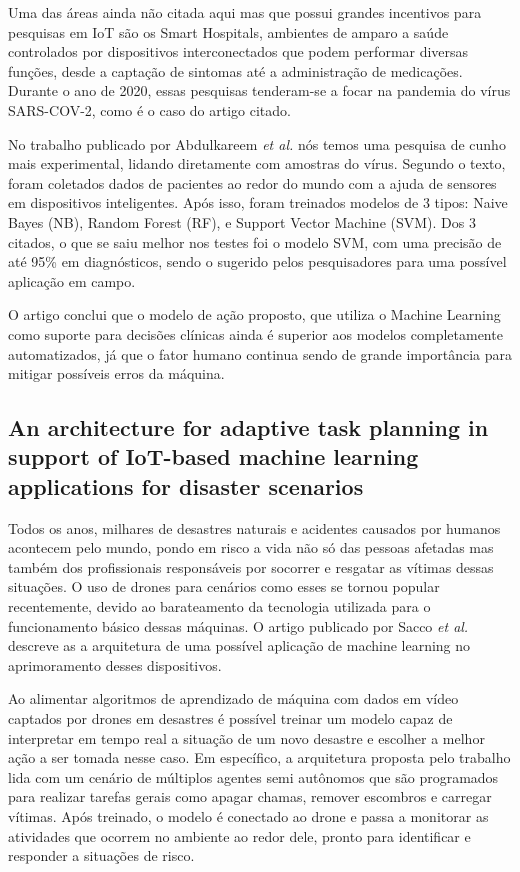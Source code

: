 \documentclass[12pt]{article}
\begin{document}
Uma das áreas ainda não citada aqui mas que possui grandes incentivos para pesquisas em IoT são os Smart Hospitals, ambientes de amparo a saúde controlados por dispositivos interconectados que podem performar diversas funções, desde a captação de sintomas até a administração de medicações. Durante o ano de 2020, essas pesquisas tenderam-se a focar na pandemia do vírus SARS-COV-2, como é o caso do artigo citado.

No trabalho publicado por Abdulkareem \emph{et al.} nós temos uma pesquisa de cunho mais experimental, lidando diretamente com amostras do vírus. Segundo o texto, foram coletados dados de pacientes ao redor do mundo com a ajuda de sensores em dispositivos inteligentes. Após isso, foram treinados modelos de 3 tipos: Naive Bayes (NB), Random Forest (RF), e Support Vector Machine (SVM). Dos 3 citados, o que se saiu melhor nos testes foi o modelo SVM, com uma precisão de até 95\% em diagnósticos, sendo o sugerido pelos pesquisadores para uma possível aplicação em campo.

O artigo conclui que o modelo de ação proposto, que utiliza o Machine Learning como suporte para decisões clínicas ainda é superior aos modelos completamente automatizados, já que o fator humano continua sendo de grande importância para mitigar possíveis erros da máquina.

\subsection{An architecture for adaptive task planning in support of IoT-based machine learning applications for disaster scenarios \cite{sacco}}

Todos os anos, milhares de desastres naturais e acidentes causados por humanos acontecem pelo mundo, pondo em risco a vida não só das pessoas afetadas mas também dos profissionais responsáveis por socorrer e resgatar as vítimas dessas situações. O uso de drones para cenários como esses se tornou popular recentemente, devido ao barateamento da tecnologia utilizada para o funcionamento básico dessas máquinas. O artigo publicado por Sacco \emph{et al.} descreve as a arquitetura de uma possível aplicação de machine learning no aprimoramento desses dispositivos.

Ao alimentar algoritmos de aprendizado de máquina com dados em vídeo captados por drones em desastres é possível treinar um modelo capaz de interpretar em tempo real a situação de um novo desastre e escolher a melhor ação a ser tomada nesse caso. Em específico, a arquitetura proposta pelo trabalho lida com um cenário de múltiplos agentes semi autônomos que são programados para realizar tarefas gerais como apagar chamas, remover escombros e carregar vítimas. Após treinado, o modelo é conectado ao drone e passa a monitorar as atividades que ocorrem no ambiente ao redor dele, pronto para identificar e responder a situações de risco.
\end{document}
